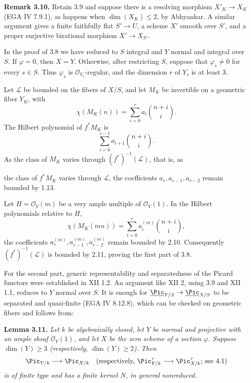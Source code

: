\textbf{Remark 3.10.} Retain 3.9 and suppose there is a resolving
morphism \(X'_K\to X_K\) (EGA IV 7.9.1), as happens when
\(\dim(X_K)\le2\), by Abhyankar. A similar argument gives a finite
faithfully flat \(S'\to U\), a scheme \(X'\) smooth over \(S'\), and a
proper surjective birational morphism \(X'\to X_{S'}\).

In the proof of 3.8 we have reduced to \(S\) integral and \(Y\) normal and
integral over \(S\). If \(\varphi=0\), then \(X=Y\). Otherwise, after
restricting \(S\), suppose that \(\varphi_s\ne0\) for every \(s\in S\).
Thus \(\varphi_s\) is \(\mathcal O_{Y_s}\)-regular, and the dimension
\(r\) of \(Y_s\) is at least \(3\).

Let \(\mathscr L\) be bounded on the fibers of \(X/S\), and let \(M_K\)
be invertible on a geometric fiber \(Y_K\), with
\[
\chi(M_K(n))=\sum_{i=0}^{r}a_i\binom{n+i}{i}.
\]
The Hilbert polynomial of \(f^*M_K\) is
\[
\sum_{i=0}^{r-1}a_{i+1}\binom{n+i}{i}.
\]
As the class of \(M_K\) varies through \((f^*)^{-1}(\mathscr L)\), that
is, as

the class of \(f^*M_K\) varies through \(\mathscr L\), the coefficients
\(a_r,a_{r-1},a_{r-2}\) remain bounded by 1.13.

Let \(H=\mathcal O_Y(m)\) be a very ample multiple of
\(\mathcal O_Y(1)\). In the Hilbert polynomials relative to \(H\),
\[
\chi(M_K(mn))=\sum_{i=0}^{r}a_i^{(m)}\binom{n+i}{i},
\]
the coefficients \(a_r^{(m)},a_{r-1}^{(m)},a_{r-2}^{(m)}\) remain bounded
by 2.10. Consequently \((f^*)^{-1}(\mathscr L)\) is bounded by 2.11,
proving the first part of 3.8.

For the second part, generic representability and separatedness of the
Picard functors were established in XII 1.2. An argument like XII 2,
using 3.9 and XII 1.1, reduces to \(Y\) normal over \(S\). It is enough
for \(\underline{\Pic}_{Y/S}\to\underline{\Pic}_{X/S}\) to be separated
and quasi-finite (EGA IV 8.12.8), which can be checked on geometric
fibers and follows from:

\textbf{Lemma 3.11.} \emph{Let \(k\) be algebraically closed, let \(Y\)
be normal and projective with an ample sheaf \(\mathcal O_Y(1)\), and let
\(X\) be the zero scheme of a section \(\varphi\). Suppose
\(\dim(Y)\ge3\) (respectively, \(\dim(Y)\ge2\)). Then}
\[
\Pic_{Y/k}\longrightarrow\Pic_{X/k}
\quad
\text{(respectively, }\Pic^\tau_{Y/k}\longrightarrow\Pic^\tau_{X/k}
\text{; see 4.1)}
\]
\emph{is of finite type and has a finite kernel \(N\), in general
nonreduced.}

